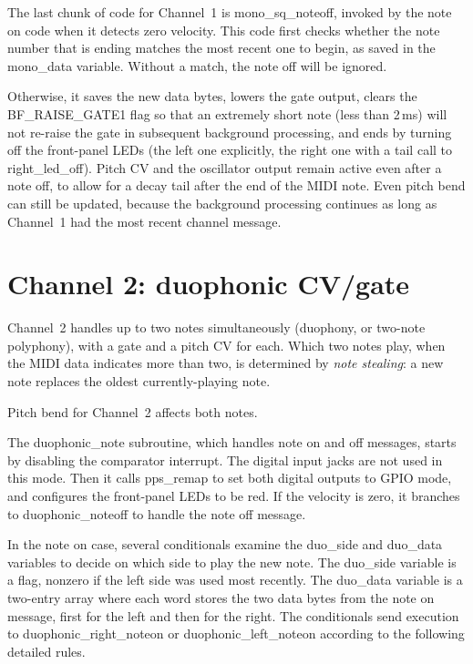 The last chunk of code for Channel~1 is mono\_sq\_noteoff, invoked by the
note on code when it detects zero velocity.  This code first checks whether
the note number that is ending matches the most recent one to begin, as
saved in the mono\_data variable.  Without a match, the note off will be
ignored.

Otherwise, it saves the new data bytes, lowers the gate output, clears the
BF\_RAISE\_GATE1 flag so that an extremely short note (less than 2\,ms) will
not re-raise the gate in subsequent background processing, and ends by
turning off the front-panel LEDs (the left one explicitly, the right one
with a tail call to right\_led\_off).  Pitch CV and the oscillator output
remain active even after a note off, to allow for a decay tail after the end
of the MIDI note.  Even pitch bend can still be updated, because the
background processing continues as long as Channel~1 had the most recent
channel message.

\section{Channel 2:  duophonic CV/gate}

Channel~2 handles up to two notes simultaneously (duophony, or two-note
polyphony), with a gate and a pitch CV for each.  Which two notes play, when
the MIDI data indicates more than two, is determined by \emph{note
stealing}:  a new note replaces the oldest currently-playing note.

Pitch bend for Channel~2 affects both notes.

The duophonic\_note subroutine, which handles note on and off messages,
starts by disabling the comparator interrupt.  The digital input jacks are
not used in this mode.  Then it calls pps\_remap to set both digital outputs
to GPIO mode, and configures the front-panel LEDs to be red.  If the
velocity is zero, it branches to duophonic\_noteoff to handle the note off
message.

In the note on case, several conditionals examine the duo\_side and
duo\_data variables to decide on which side to play the new note.  The
duo\_side variable is a flag, nonzero if the left side was used most
recently.  The duo\_data variable is a two-entry array where each word
stores the two data bytes from the note on message, first for the left and
then for the right.  The conditionals send execution to
duophonic\_right\_noteon or duophonic\_left\_noteon according to the
following detailed rules.

